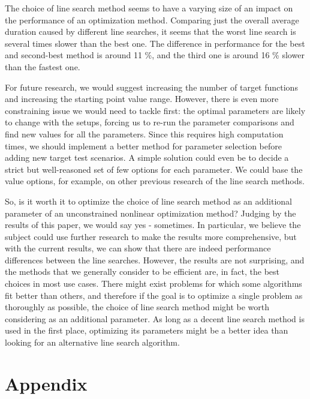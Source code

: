 \documentclass[a4paper,english,titlepage,12pt]{article}
\begin{document}
The choice of line search method seems to have a varying size of an impact on the performance of an optimization method. Comparing just the overall average duration caused by different line searches, it seems that the worst line search is several times slower than the best one. The difference in performance for the best and second-best method is around 11 \%, and the third one is around 16 \% slower than the fastest one.

For future research, we would suggest increasing the number of target functions and increasing the starting point value range. However, there is even more constraining issue we would need to tackle first: the optimal parameters are likely to change with the setups, forcing us to re-run the parameter comparisons and find new values for all the parameters. Since this requires high computation times, we should implement a better method for parameter selection before adding new target test scenarios. A simple solution could even be to decide a strict but well-reasoned set of few options for each parameter. We could base the value options, for example, on other previous research of the line search methods.

So, is it worth it to optimize the choice of line search method as an additional parameter of an unconstrained nonlinear optimization method? Judging by the results of this paper, we would say yes - sometimes. In particular, we believe the subject could use further research to make the results more comprehensive, but with the current results, we can show that there are indeed performance differences between the line searches. However, the results are not surprising, and the methods that we generally consider to be efficient are, in fact, the best choices in most use cases. There might exist problems for which some algorithms fit better than others, and therefore if the goal is to optimize a single problem as thoroughly as possible, the choice of line search method might be worth considering as an additional parameter. As long as a decent line search method is used in the first place, optimizing its parameters might be a better idea than looking for an alternative line search algorithm.

\newpage
% 






\newpage
\appendix
\section{Appendix}
\label{sect:appendix}

\end{document}
